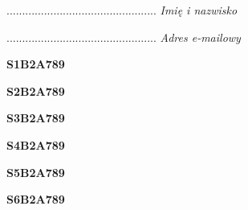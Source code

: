 \begin{turn}{90}\begin{minipage}{\linewidth} \vspace{20mm} ................................................  \textit{Imię i nazwisko}\end{minipage}\end{turn}

\begin{turn}{90}\begin{minipage}{\linewidth} \vspace{20mm} ................................................  \textit{Adres e-mailowy}\end{minipage}\end{turn}

\begin{turn}{90}\huge \begin{minipage}{\linewidth} \vspace{10mm}\textbf{S1B2A789}\end{minipage}\end{turn}

\begin{turn}{90}\huge \begin{minipage}{\linewidth} \vspace{10mm}\textbf{S2B2A789}\end{minipage}\end{turn}

\begin{turn}{90}\huge \begin{minipage}{\linewidth} \vspace{10mm}\textbf{S3B2A789}\end{minipage}\end{turn}

\begin{turn}{90}\huge \begin{minipage}{\linewidth} \vspace{10mm}\textbf{S4B2A789}\end{minipage}\end{turn}

\begin{turn}{90}\huge \begin{minipage}{\linewidth} \vspace{10mm}\textbf{S5B2A789}\end{minipage}\end{turn}

\begin{turn}{90}\huge \begin{minipage}{\linewidth} \vspace{10mm}\textbf{S6B2A789}\end{minipage}\end{turn}

